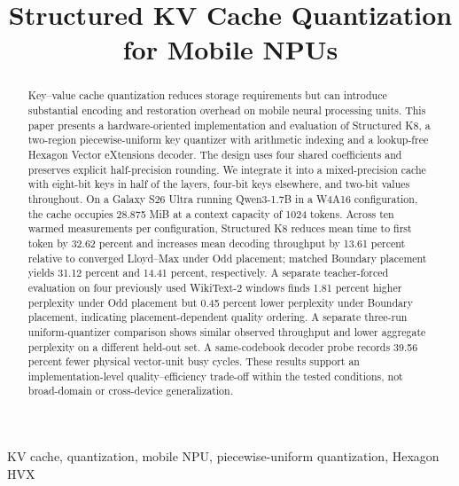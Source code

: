 \documentclass[conference,a4paper,10pt]{IEEEtran}
\begin{document}
\title{Structured KV Cache Quantization for Mobile NPUs}
\author{
}
\maketitle

\begin{abstract}
Key--value cache quantization reduces storage requirements but can introduce substantial encoding and restoration overhead on mobile neural processing units. This paper presents a hardware-oriented implementation and evaluation of Structured K8, a two-region piecewise-uniform key quantizer with arithmetic indexing and a lookup-free Hexagon Vector eXtensions decoder. The design uses four shared coefficients and preserves explicit half-precision rounding. We integrate it into a mixed-precision cache with eight-bit keys in half of the layers, four-bit keys elsewhere, and two-bit values throughout. On a Galaxy S26 Ultra running Qwen3-1.7B in a W4A16 configuration, the cache occupies 28.875 MiB at a context capacity of 1024 tokens. Across ten warmed measurements per configuration, Structured K8 reduces mean time to first token by 32.62 percent and increases mean decoding throughput by 13.61 percent relative to converged Lloyd--Max under Odd placement; matched Boundary placement yields 31.12 percent and 14.41 percent, respectively. A separate teacher-forced evaluation on four previously used WikiText-2 windows finds 1.81 percent higher perplexity under Odd placement but 0.45 percent lower perplexity under Boundary placement, indicating placement-dependent quality ordering. A separate three-run uniform-quantizer comparison shows similar observed throughput and lower aggregate perplexity on a different held-out set. A same-codebook decoder probe records 39.56 percent fewer physical vector-unit busy cycles. These results support an implementation-level quality--efficiency trade-off within the tested conditions, not broad-domain or cross-device generalization.
\end{abstract}

\begin{IEEEkeywords}
KV cache, quantization, mobile NPU, piecewise-uniform quantization, Hexagon HVX
\end{IEEEkeywords}
\end{document}
